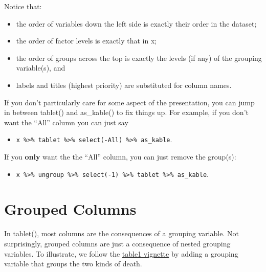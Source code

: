 \documentclass[]{article}
\providecommand{\tightlist}{%
  \setlength{\itemsep}{0pt}\setlength{\parskip}{0pt}}
\begin{document}
Notice that:

\begin{itemize}
\tightlist
\item
  the order of variables down the left side is exactly their order in
  the dataset;
\item
  the order of factor levels is exactly that in x;
\item
  the order of groups across the top is exactly the levels (if any) of
  the grouping variable(s), and
\item
  labels and titles (highest priority) are substituted for column names.
\end{itemize}

If you don't particularly care for some aspect of the presentation, you
can jump in between tablet() and as\_kable() to fix things up. For
example, if you don't want the ``All'' column you can just say

\begin{itemize}
\tightlist
\item
  \texttt{x\ \%\textgreater{}\%\ tablet\ \%\textgreater{}\%\ select(-All)\ \%\textgreater{}\%\ as\_kable}.
\end{itemize}

If you \textbf{only} want the the ``All'' column, you can just remove
the group(s):

\begin{itemize}
\tightlist
\item
  \texttt{x\ \%\textgreater{}\%\ ungroup\ \%\textgreater{}\%\ select(-1)\ \%\textgreater{}\%\ tablet\ \%\textgreater{}\%\ as\_kable}.
\end{itemize}

\hypertarget{grouped-columns}{%
\section{Grouped Columns}\label{grouped-columns}}

In tablet(), most columns are the consequences of a grouping variable.
Not surprisingly, grouped columns are just a consequence of nested
grouping variables. To illustrate, we follow the
\href{https://cran.r-project.org/web/packages/table1/vignettes/table1-examples.html}{table1
vignette} by adding a grouping variable that groups the two kinds of
death.
\end{document}
